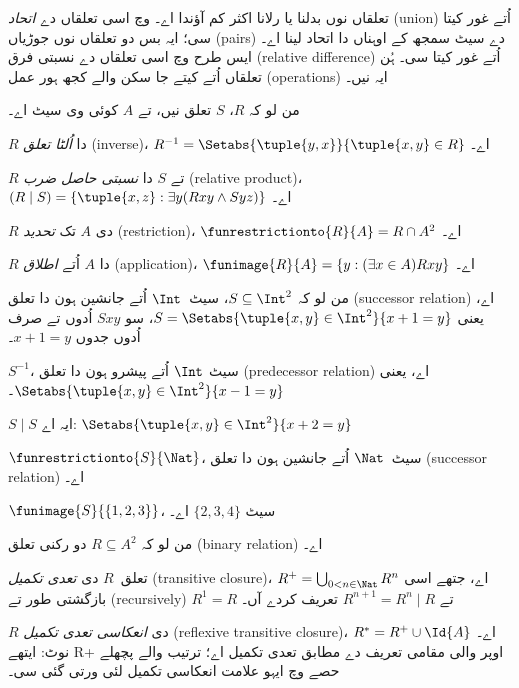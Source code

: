 \documentclass[../../../include/open-logic-section]{subfiles}
\begin{document}

تعلقاں نوں بدلنا یا رلانا اکثر کم آؤندا اے۔
 وچ اسی تعلقاں دے \emph{اتحاد}
(union) اُتے غور کیتا سی؛ ایہ بس دو تعلقاں نوں جوڑیاں (pairs) دے سیٹ
سمجھ کے اوہناں
دا اتحاد لینا اے۔ ایس طرح 
وچ اسی تعلقاں دے نسبتی فرق (relative difference) اُتے غور کیتا سی۔ ہُن
تعلقاں اُتے کیتے جا سکن والے کجھ ہور عمل (operations) ایہ نیں۔

\begin{defn} 
من لو کہ $R$، $S$ تعلق نیں، تے $A$ کوئی وی سیٹ اے۔

$R$ دا \emph{اُلٹا تعلق} (inverse)، $R^{-1} = \Setabs{\tuple{y, x}}{\tuple{x,
    y} \in R}$ اے۔

$R$ تے $S$ دا \emph{نسبتی حاصل ضرب} (relative product)، $(R \mid S) =
\{\tuple{x, z} : \exists y(Rxy \land Syz)\}$ اے۔

$R$ دی $A$ تک \emph{تحدید} (restriction)، $\funrestrictionto{R}{A}= R
\cap A^2$ اے۔

$R$ دا $A$ اُتے \emph{اطلاق} (application)، $\funimage{R}{A} = \{y :
(\exists x \in A)Rxy\}$ اے۔
\end{defn}

\begin{ex}
من لو کہ $S \subseteq \Int^2$، سیٹ~$\Int$ اُتے جانشین ہون دا تعلق
(successor relation) اے،
یعنی $S = \Setabs{\tuple{x, y} \in \Int^2}{x + 1 = y}$، سو $Sxy$ اُدوں
تے صرف اُدوں جدوں $x + 1 = y$۔

$S^{-1}$، سیٹ $\Int$ اُتے پیشرو ہون دا تعلق (predecessor relation) اے، یعنی
$\Setabs{\tuple{x,y}\in\Int^2}{x -1 =y}$۔

$S\mid S$ ایہ اے:
$ \Setabs{\tuple{x,y}\in\Int^2}{x + 2 =y}$

$\funrestrictionto{S}{\Nat}$، سیٹ~$\Nat$ اُتے جانشین ہون دا تعلق
(successor relation) اے۔

$\funimage{S}{\{1,2,3\}}$، سیٹ $\{2, 3, 4\}$ اے۔
\end{ex}

\begin{defn}من لو کہ $R \subseteq A^2$
دو رکنی تعلق (binary relation) اے۔

تعلق~$R$ دی \emph{تعدی تکمیل} (transitive closure)، $R^+ = \bigcup_{0 < n \in
\Nat} R^n$ اے، جتھے اسی بازگشتی طور تے (recursively) $R^1 = R$ تے $R^{n+1} = R^n
\mid R$ تعریف کردے آں۔

$R$ دی \emph{انعکاسی تعدی تکمیل} (reflexive transitive closure)، $R^* = R^+ \cup
\Id{A}$ اے۔
نوٹ: ایتھے R+ اوپر والی مقامی تعریف دے مطابق تعدی تکمیل اے؛ ترتیب والے
پچھلے حصے وچ ایہو علامت انعکاسی تکمیل لئی ورتی گئی سی۔
\end{defn}
\end{document}

